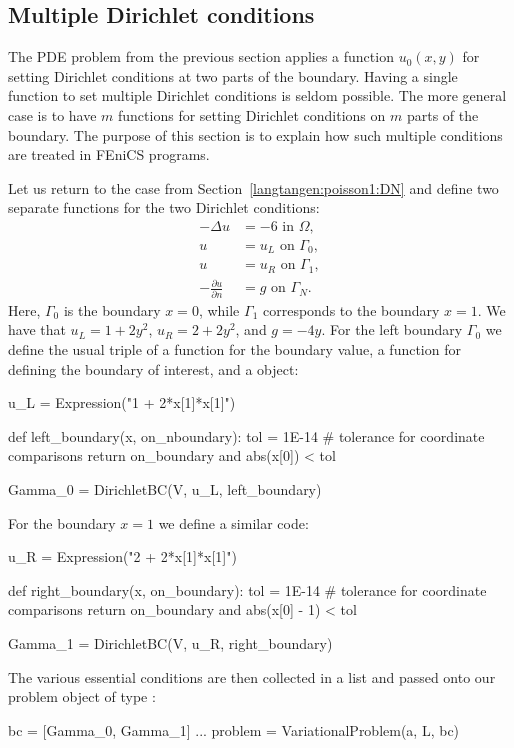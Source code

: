 \subsection{Multiple Dirichlet conditions}
\label{langtangen:poisson:multiple:Dirichlet}

The PDE problem from the previous section applies a function $u_0(x,y)$
for setting Dirichlet conditions at two parts of the boundary.
Having a single function to set multiple Dirichlet conditions is seldom
possible. The more general case is to have $m$ functions for setting
Dirichlet conditions on $m$ parts of the boundary. The purpose of this
section is to explain how such multiple conditions are treated in FEniCS
programs.

Let us return to the case from Section~\ref{langtangen:poisson1:DN}
and define two separate functions for the two Dirichlet conditions:
\begin{align}
  - \Delta u &= -6 \mbox{ in } \Omega,
\\
  u &= u_L \mbox{ on } \Gamma_0,
\\
  u &= u_R \mbox{ on } \Gamma_1,
\\
  - \frac{\partial u}{\partial n} &= g \mbox{ on } \Gamma_N.
\end{align}
Here, $\Gamma_0$ is the boundary $x=0$, while $\Gamma_1$ corresponds to
the boundary $x=1$.  We have that $u_L = 1 + 2y^2$, $u_R = 2 + 2y^2$,
and $g=-4y$.  For the left boundary $\Gamma_0$ we define the usual
triple of a function for the boundary value, a function for defining
the boundary of interest, and a  object:
\begin{python}
u_L = Expression("1 + 2*x[1]*x[1]")

def left_boundary(x, on_nboundary):
    tol = 1E-14   # tolerance for coordinate comparisons
    return on_boundary and abs(x[0]) < tol

Gamma_0 = DirichletBC(V, u_L, left_boundary)
\end{python}

For the boundary $x=1$ we define a similar code:
\begin{python}
u_R = Expression("2 + 2*x[1]*x[1]")

def right_boundary(x, on_boundary):
    tol = 1E-14   # tolerance for coordinate comparisons
    return on_boundary and abs(x[0] - 1) < tol

Gamma_1 = DirichletBC(V, u_R, right_boundary)
\end{python}
The various essential conditions are then collected in a list and passed
onto our problem object of type :
\begin{python}
bc = [Gamma_0, Gamma_1]
...
problem = VariationalProblem(a, L, bc)
\end{python}

